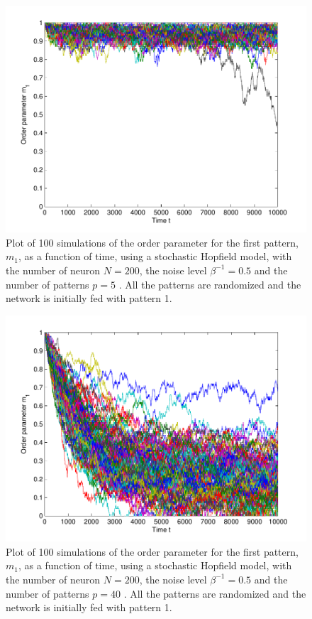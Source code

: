 \documentclass[12pt,a4paper]{article}
\begin{document}
\begin{figure}\centering
\includegraphics[width=\textwidth]{uppg3_5.pdf}
\caption{\label{uppg3_5} Plot of 100 simulations of the
order parameter for the first pattern, $m_1$, as a function of time, using
a stochastic Hopfield model, with the number of neuron $N = 200$, the
noise level $\beta^{-1} = 0.5$ and the number of patterns $p=5$ . All the
patterns are randomized and the network is initially fed with pattern 1. }
\end{figure}
\begin{figure}\centering
\includegraphics[width=\textwidth]{uppg3_40.pdf}
\caption{\label{uppg3_40} Plot of 100 simulations of the
order parameter for the first pattern, $m_1$, as a function of time, using
a stochastic Hopfield model, with the number of neuron $N = 200$, the
noise level $\beta^{-1} = 0.5$ and the number of patterns $p=40$ . All the
patterns are randomized and the network is initially fed with pattern 1. }
\end{figure}
\end{document}
